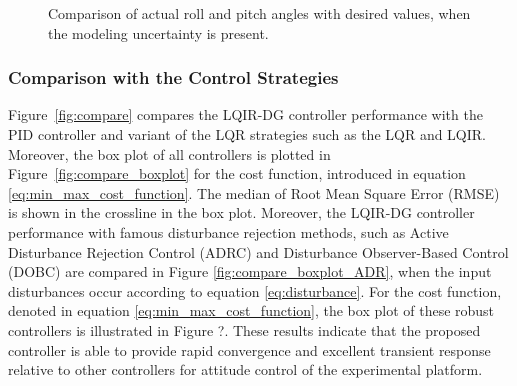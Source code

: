\documentclass[3p]{elsarticle}
\begin{document}
\begin{figure}[H]
    \caption{Comparison of actual roll and pitch angles with desired values, when the modeling uncertainty is present.}
    \label{fig:weight}
\end{figure}
\subsubsection{Comparison with the Control Strategies}
\noindent Figure~\ref{fig:compare} compares the LQIR-DG controller performance with the PID controller and variant of the LQR strategies such as the LQR and LQIR. 
Moreover, the box plot of all controllers is plotted in Figure~\ref{fig:compare_boxplot} for the cost function, introduced in equation \eqref{eq:min_max_cost_function}. %
The median of Root Mean Square Error (RMSE) is shown in the crossline in the box plot.
Moreover, the LQIR-DG controller performance with famous disturbance rejection methods, such as Active Disturbance Rejection Control (ADRC) \cite{CHENG2023} and Disturbance Observer-Based Control (DOBC) \cite{AGHAYAN202320} are compared in Figure \ref{fig:compare_boxplot_ADR}, when the input disturbances occur according to equation \eqref{eq:disturbance}. For the cost function, denoted in equation \eqref{eq:min_max_cost_function}, the box plot of these robust controllers is illustrated in Figure ?. 
These results indicate that the proposed controller is able to provide rapid convergence and excellent transient response relative to other controllers for attitude control of the experimental platform.
\end{document}
